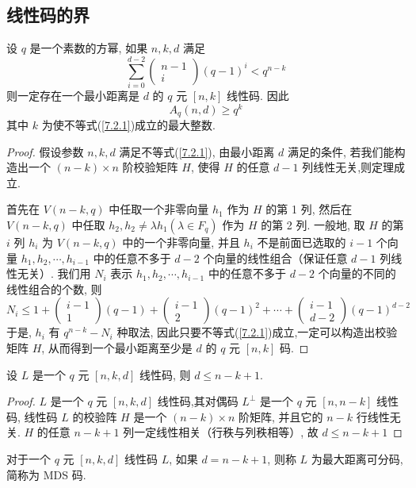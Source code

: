 \subsection{线性码的界}
\begin{theorem}[$ G-V $ 界]
    设 $ q $ 是一个素数的方幂, 如果 $ n, k, d $ 满足
\begin{equation}\label{7.2.1}
    \sum_{i=0}^{d-2}\left(\begin{array}{c}
n-1 \\
i
\end{array}\right)(q-1)^{i}<q^{n-k}
\end{equation}
则一定存在一个最小距离是 $ d $ 的 $ q $ 元 $ [n, k] $ 线性码. 因此
$$
A_{q}(n, d) \geq q^{k}
$$
其中 $ k $ 为使不等式(\ref{7.2.1})成立的最大整数.
\end{theorem}
\begin{proof}
    假设参数 $ n, k, d $ 满足不等式(\ref{7.2.1}), 由最小距离 $ d $ 满足的条件, 若我们能构造出一个 $ (n-k) \times n $ 阶校验矩阵 $ H $, 使得 $ H $ 的任意 $ d-1 $ 列线性无关,则定理成立.

    首先在 $ V(n-k, q) $ 中任取一个非零向量 $ h_{1} $ 作为 $ H $ 的第 1 列, 然后在 $ V(n-k, q) $ 中任取 $ h_{2}, h_{2} \neq \lambda h_{1}\left(\lambda \in F_{q}\right) $ 作为 $ H $ 的第 2 列.
一般地, 取 $ H $ 的第 $ i $ 列 $ h_{i} $ 为 $ V(n-k, q) $ 中的一个非零向量, 并且 $ h_{i} $ 不是前面已选取的 $ i-1 $ 个向量 $ h_{1}, h_{2}, \cdots, h_{i-1} $ 中的任意不多于 $ d-2 $ 个向量的线性组合（保证任意 $ d-1 $ 列线性无关）. 我们用 $ N_{i} $ 表示 $ h_{1}, h_{2}, \cdots, h_{i-1} $ 中的任意不多于 $ d-2 $ 个向量的不同的线性组合的个数, 则
$$
N_{i} \leq 1+\left(\begin{array}{c}
i-1 \\
1
\end{array}\right)(q-1)+\left(\begin{array}{c}
i-1 \\
2
\end{array}\right)(q-1)^{2}+\cdots+\left(\begin{array}{c}
i-1 \\
d-2
\end{array}\right)(q-1)^{d-2}
$$
于是, $ h_{i} $ 有 $ q^{n-k}-N_{i} $ 种取法, 因此只要不等式(\ref{7.2.1})成立,一定可以构造出校验矩阵 $ H $, 从而得到一个最小距离至少是 $ d $ 的 $ q $ 元 $ [n, k] $ 码.
\end{proof}



\begin{theorem}
 设 $ L $ 是一个 $ q $ 元 $ [n, k, d] $ 线性码, 则 $ d \leq n-k+1 $.
\end{theorem}
\begin{proof}
$ L $ 是一个 $ q $ 元 $ [n, k, d] $ 线性码,其对偶码 $ L^{\perp} $ 是一个 $ q $ 元 $ [n, n-k] $ 线性码, 线性码 $ L $ 的校验阵 $ H $ 是一个 $ (n-k) \times n $ 阶矩阵, 并且它的 $ n-k $ 行线性无关. $ H $ 的任意 $ n-k+1 $ 列一定线性相关（行秩与列秩相等）, 故 $ d \leq n-k+1 $
\end{proof}
\begin{remark}
对于一个 $ q $ 元 $ [n, k, d] $ 线性码 $ L $, 如果 $ d=n-k+1 $, 则称 $ L $ 为最大距离可分码, 简称为 MDS 码.
\end{remark}